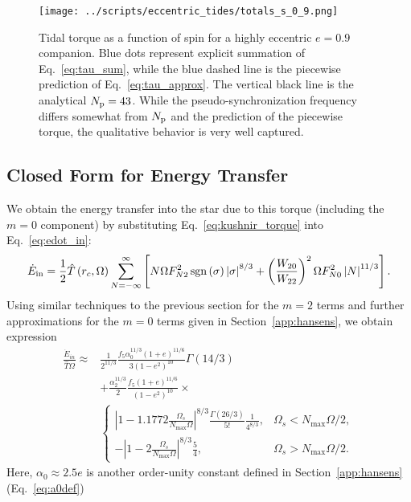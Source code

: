 \documentclass[
        fleqn,
        usenatbib,
        referee,
    ]{mnras}
\newcommand*{\abs}[1]{\left|#1\right|}
\newcommand*{\p}[1]{\left(#1\right)}
\newcommand*{\s}[1]{\left[#1\right]}
\DeclareMathOperator*{\sgn}{sgn}
\begin{document}
\begin{figure}
    \centering
    \texttt{[image: ../scripts/eccentric\_tides/totals\_s\_0\_9.png]}
    \caption{Tidal torque as a function of spin for a highly eccentric $e = 0.9$
    companion. Blue dots represent explicit summation of Eq.~\eqref{eq:tau_sum},
    while the blue dashed line is the piecewise prediction of
    Eq.~\eqref{eq:tau_approx}. The vertical black line is the analytical $N_{\rm
    p} = 43$. While the pseudo-synchronization frequency differs somewhat
    from $N_{\rm p}$ and the prediction of the piecewise torque, the
    qualitative behavior is very well captured.}\label{fig:totals_s}
\end{figure}

\subsection{Closed Form for Energy Transfer}

We obtain the energy transfer into the star due to this torque (including the $m
= 0$ component) by substituting Eq.~\eqref{eq:kushnir_torque} into
Eq.~\eqref{eq:edot_in}:
\begin{align}
     \dot{E}_{\rm in} = \frac{1}{2}\hat{T}\p{r_c, \Omega}
         \sum\limits_{N = -\infty}^\infty\s{
            N\Omega F_{N2}^2 \sgn \p{\sigma} \abs{\sigma}^{8/3}
            + \p{\frac{W_{20}}{W_{22}}}^2\Omega F_{N0}^2 \abs{N}^{11/3}}.
            \label{eq:e_sum}
\end{align}
Using similar techniques to the previous section for the $m=2$ terms and further
approximations for the $m = 0$ terms given in Section~\ref{app:hansens}, we
obtain expression
\begin{align}
    \frac{\dot{E}_{in}}{\hat{T}\Omega} \approx{}&
            \frac{1}{2^{11/3}}
            \frac{f_5 \alpha_{0}^{11/3}\p{1 + e}^{11/6}}{3\p{1 - e^2}^{10}}
            \Gamma\p{14/3}\nonumber\\
        & + \frac{\alpha_{2}^{11/3}}{2}
                \frac{f_5\p{1 + e}^{11/6}}{\p{1 - e^2}^{10}}
                \times\nonumber\\
        &\begin{cases}
            \abs{1 - 1.1772\frac{\Omega_s}{N_{\max}\Omega}}^{8/3}
                \frac{\Gamma(26/3)}{5!}\frac{1}{4^{8/3}},
                & \Omega_s < N_{\max}\Omega/2,\\[5pt]
            -\abs{1 - 2\frac{\Omega_s}{N_{\max}\Omega}}^{8/3}\frac{5}{4},
                & \Omega_s > N_{\max}\Omega/2.
        \end{cases}\label{eq:total_heating}
\end{align}
Here, $\alpha_0 \approx 2.5e$ is another order-unity constant defined in
Section~\ref{app:hansens} (Eq.~\eqref{eq:a0def})
\end{document}
